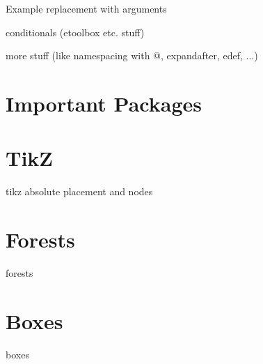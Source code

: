 \begin{frame}
   Example replacement with arguments
\end{frame}

\begin{frame}
   conditionals (etoolbox etc. stuff)
\end{frame}

\begin{frame}
   more stuff (like namespacing with @, expandafter, edef, ...)
\end{frame}

\section[Packages]{Important Packages}
\begin{frame}{\insertsection}

\end{frame}

\section{TikZ}

\begin{frame}{\insertsection}
   tikz absolute placement and nodes
\end{frame}

\section{Forests}
\begin{frame}{\insertsection}
   forests
\end{frame}

\section{Boxes}
\begin{frame}{\insertsection}
   boxes
\end{frame}



